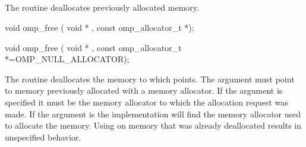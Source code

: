 \subsection{}
\label{subsec:omp_free}

\summary
The  routine deallocates previously allocated memory. 

\format

\begin{cspecific}
\begin{boxedcode}
void omp_free ( void * , const omp\_allocator\_t *);
\end{boxedcode}
\end{cspecific}
\begin{cppspecific}
\begin{boxedcode}
void omp_free ( void * , 
             const omp\_allocator\_t *=OMP_NULL_ALLOCATOR);
\end{boxedcode}
\end{cppspecific}

\effect

The  routine deallocates the memory to which  points. The  argument must point to memory previously allocated with a memory allocator. If the  argument is specified it must be the memory allocator to which the allocation request was made. If the  argument is  the implementation will find the memory allocator used to allocate the memory. Using  on memory that was already deallocated results in unspecified behavior.

\ccppspecificend
